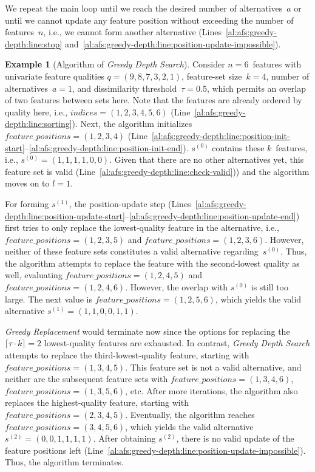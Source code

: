 \documentclass{article}
\theoremstyle{definition}
\newtheorem{example}{Example}
\begin{document}
We repeat the main loop until we reach the desired number of alternatives~$a$ or until we cannot update any feature position without exceeding the number of features~$n$, i.e., we cannot form another alternative (Lines~\ref{al:afs:greedy-depth:line:stop} and~\ref{al:afs:greedy-depth:line:position-update-impossible}).
%
\begin{example}[Algorithm of \emph{Greedy Depth Search}]
	Consider $n=6$~features with univariate feature qualities $q = (9,8,7,3,2,1)$, feature-set size~$k=4$, number of alternatives~$a=1$, and dissimilarity threshold~$\tau = 0.5$, which permits an overlap of two features between sets here.
	Note that the features are already ordered by quality here, i.e., $\mathit{indices} = (1,2,3,4,5,6)$ (Line~\ref{al:afs:greedy-depth:line:sorting}).
	Next, the algorithm initializes $\mathit{feature\_positions} = (1,2,3,4)$ (Line~\ref{al:afs:greedy-depth:line:position-init-start}--\ref{al:afs:greedy-depth:line:position-init-end}).
	$s^{(0)}$ contains these $k$~features, i.e., $s^{(0)} = (1,1,1,1,0,0)$.
	Given that there are no other alternatives yet, this feature set is valid (Line~\ref{al:afs:greedy-depth:line:check-valid})) and the algorithm moves on to $l=1$.
	
	For forming $s^{(1)}$, the position-update step (Lines~\ref{al:afs:greedy-depth:line:position-update-start}--\ref{al:afs:greedy-depth:line:position-update-end}) first tries to only replace the lowest-quality feature in the alternative, i.e., $\mathit{feature\_positions} = (1,2,3,5)$ and $\mathit{feature\_positions} = (1,2,3,6)$.
	However, neither of these feature sets constitutes a valid alternative regarding~$s^{(0)}$.
	Thus, the algorithm attempts to replace the feature with the second-lowest quality as well, evaluating $\mathit{feature\_positions} = (1,2,4,5)$ and $\mathit{feature\_positions} = (1,2,4,6)$.
	However, the overlap with $s^{(0)}$ is still too large.
	The next value is $\mathit{feature\_positions} = (1,2,5,6)$, which yields the valid alternative $s^{(1)} = (1,1,0,0,1,1)$.
	
	\emph{Greedy Replacement} would terminate now since the options for replacing the $\lceil \tau \cdot k \rceil = 2$ lowest-quality features are exhausted.
	In contrast, \emph{Greedy Depth Search} attempts to replace the third-lowest-quality feature, starting with $\mathit{feature\_positions} = (1,3,4,5)$.
	This feature set is not a valid alternative, and neither are the subsequent feature sets with $\mathit{feature\_positions} = (1,3,4,6)$, $\mathit{feature\_positions} = (1,3,5,6)$, etc.
	After more iterations, the algorithm also replaces the highest-quality feature, starting with $\mathit{feature\_positions} = (2,3,4,5)$.
	Eventually, the algorithm reaches $\mathit{feature\_positions} = (3,4,5,6)$, which yields the valid alternative $s^{(2)} = (0,0,1,1,1,1)$.
	After obtaining $s^{(2)}$, there is no valid update of the feature positions left (Line~\ref{al:afs:greedy-depth:line:position-update-impossible}).
	Thus, the algorithm terminates.
	\label{ex:afs:greedy-depth:algorithm}
\end{example}
\end{document}
